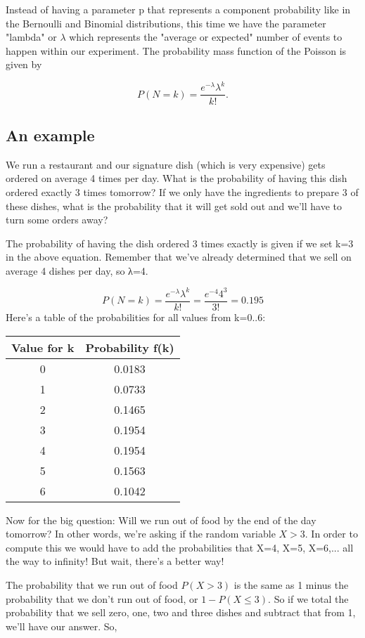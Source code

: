 Instead of having a parameter p that represents a component probability like in the Bernoulli and Binomial distributions, this time we have the parameter "lambda" or $\lambda$ which represents the "average or expected" number of events to happen within our experiment. The probability mass function of the Poisson is given by

$$P(N=k)=\frac{e^{-\lambda}\lambda^k}{k!}.$$
\subsection{An example}
We run a restaurant and our signature dish (which is very expensive) gets ordered on average 4 times per day. What is the probability of having this dish ordered exactly 3 times tomorrow? If we only have the ingredients to prepare 3 of these dishes, what is the probability that it will get sold out and we'll have to turn some orders away?

The probability of having the dish ordered 3 times exactly is given if we set k=3 in the above equation. Remember that we've already determined that we sell on average 4 dishes per day, so λ=4.

$$P(N=k)=\frac{e^{-\lambda}\lambda^k}{k!} = \frac{e^{-4} 4^3}{3!} = 0.195$$
Here's a table of the probabilities for all values from k=0..6:

\begin{tabular}{|c|c|}
Value for k& Probability f(k) \\ \hline
0& 0.0183 \\ \hline
1& 0.0733 \\ \hline
2& 0.1465 \\ \hline
3& 0.1954 \\ \hline
4& 0.1954 \\ \hline
5& 0.1563 \\ \hline
6& 0.1042 \\ \hline
\end{tabular}

Now for the big question: Will we run out of food by the end of the day tomorrow? In other words, we're asking if the random variable $X>3$. 
In order to compute this we would have to add the probabilities that X=4, X=5, X=6,... all the way to infinity! But wait, there's a better way!

The probability that we run out of food $P(X>3)$ is the same as 1 minus the probability that we don't run out of food, or $1-P(X \leq 3)$. So if we total the probability that we sell zero, one, two and three dishes and subtract that from 1, we'll have our answer. So,

